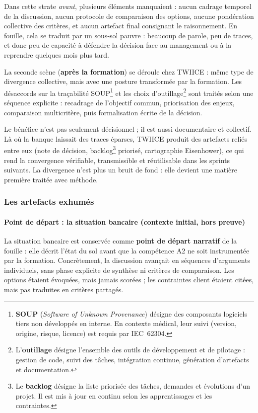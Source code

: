 Dans cette strate \textit{avant}, plusieurs éléments manquaient : aucun cadrage temporel de la discussion, aucun protocole de comparaison des options, aucune pondération collective des critères, et aucun artefact final consignant le raisonnement. En fouille, cela se traduit par un sous-sol pauvre : beaucoup de parole, peu de traces, et donc peu de capacité à défendre la décision face au management ou à la reprendre quelques mois plus tard.

La seconde scène (\textbf{après la formation}) se déroule chez TWIICE : même type de divergence collective, mais avec une posture transformée par la formation. Les désaccords sur la traçabilité SOUP\footnote{\textbf{SOUP} (\emph{Software of Unknown Provenance}) désigne des composants logiciels tiers non développés en interne. En contexte médical, leur suivi (version, origine, risque, licence) est requis par IEC~62304.} et les choix d'outillage\footnote{L'\textbf{outillage} désigne l'ensemble des outils de développement et de pilotage : gestion de code, suivi des tâches, intégration continue, génération d'artefacts et documentation.} sont traités selon une séquence explicite : recadrage de l'objectif commun, priorisation des enjeux, comparaison multicritère, puis formalisation écrite de la décision.

Le bénéfice n'est pas seulement décisionnel ; il est aussi documentaire et collectif. Là où la banque laissait des traces éparses, TWIICE produit des artefacts reliés entre eux (note de décision, backlog\footnote{Le \textbf{backlog} désigne la liste priorisée des tâches, demandes et évolutions d'un projet. Il est mis à jour en continu selon les apprentissages et les contraintes.\label{fn:backlog}} priorisé, cartographie Eisenhower), ce qui rend la convergence vérifiable, transmissible et réutilisable dans les sprints suivants. La divergence n'est plus un bruit de fond : elle devient une matière première traitée avec méthode.

\subsubsection*{Les artefacts exhumés}

\paragraph{Point de départ : la situation bancaire (contexte initial, hors preuve)}

La situation bancaire est conservée comme \textbf{point de départ narratif} de la fouille : elle décrit l'état du sol avant que la compétence A2 ne soit instrumentée par la formation. Concrètement, la discussion avançait en séquences d'arguments individuels, sans phase explicite de synthèse ni critères de comparaison. Les options étaient évoquées, mais jamais scorées ; les contraintes client étaient citées, mais pas traduites en critères partagés.


